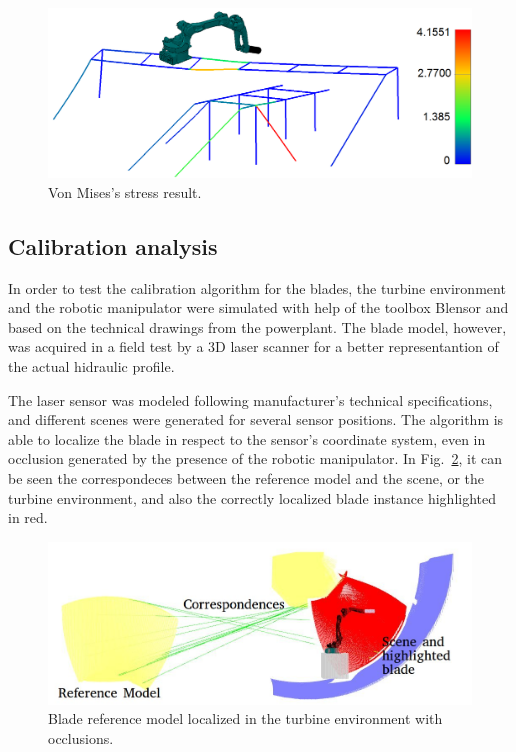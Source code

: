 \begin{figure}
	\centering
	\includegraphics[width=.95\columnwidth]{figs/mecanica/von_mises.png}
    \caption{Von Mises's stress result.}
    \label{fig:von_mises}
\end{figure}

\subsection{Calibration analysis}

In order to test the calibration algorithm for the blades, the turbine
environment and the robotic manipulator were simulated with help of the toolbox
Blensor \cite{Gschwandtner11b} and based on the technical drawings from the
powerplant. The blade model, however, was acquired in a field test by a 3D laser
scanner for a better representantion of the actual hidraulic profile.

The laser sensor was modeled following manufacturer's technical
specifications, and different scenes were generated for several sensor
positions. The algorithm is able to localize the blade in respect to the
sensor's coordinate system, even in occlusion generated by the presence of the
robotic manipulator. In Fig.~\ref{fig:calibration}, it can be seen the
correspondeces between the reference model and the scene, or the turbine
environment, and also the correctly localized blade instance highlighted in red.

\begin{figure}
	\centering
	\includegraphics[width=.95\columnwidth]{figs/results/sim_mh12_sp}
    \caption{Blade reference model localized in the turbine environment with
    occlusions.}
    \label{fig:calibration}
\end{figure}

